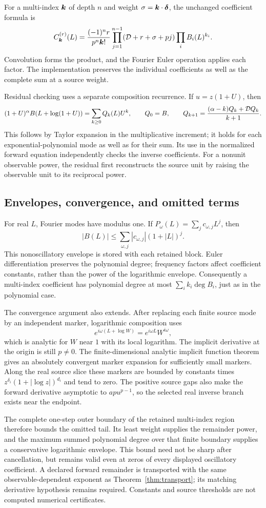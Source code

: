 For a multi-index $\boldsymbol k$ of depth $n$ and weight
$\sigma=\boldsymbol k\cdot\boldsymbol\delta$, the unchanged coefficient formula is
\[
 C^{(r)}_{\boldsymbol k}(L)=\frac{(-1)^n r}{p^n\boldsymbol k!}
 \prod_{j=1}^{n-1}(\mathcal D+r+\sigma+pj)\prod_i B_i(L)^{k_i}.
\]
Convolution forms the product, and the Fourier Euler operation applies each
factor. The implementation preserves the individual coefficients as well as
the complete sum at a source weight.

Residual checking uses a separate composition recurrence. If
$u=z(1+U)$, then
\[
 (1+U)^\alpha B(L+\log(1+U))=\sum_{k\ge0}Q_k(L)U^k,
 \qquad Q_0=B,\qquad
 Q_{k+1}=\frac{(\alpha-k)Q_k+\mathcal D Q_k}{k+1}.
\]
This follows by Taylor expansion in the multiplicative increment; it holds
for each exponential-polynomial mode as well as for their sum. Its use in
the normalized forward equation independently checks the inverse coefficients.
For a nonunit observable power, the residual first reconstructs the source
unit by raising the observable unit to its reciprocal power.

\subsection{Envelopes, convergence, and omitted terms}

For real $L$, Fourier modes have modulus one. If
$P_\omega(L)=\sum_j c_{\omega,j}L^j$, then
\[
 |B(L)|\le\sum_{\omega,j}|c_{\omega,j}|(1+|L|)^j.
\]
This nonoscillatory envelope is stored with each retained block. Euler
differentiation preserves the polynomial degree; frequency factors affect
coefficient constants, rather than the power of the logarithmic envelope.
Consequently a multi-index coefficient has polynomial degree at most
$\sum_i k_i\deg B_i$, just as in the polynomial case.

The convergence argument also extends. After replacing each finite source
mode by an independent marker, logarithmic composition uses
\[
 e^{i\omega(L+\log W)}=e^{i\omega L}W^{i\omega},
\]
which is analytic for $W$ near $1$ with its local logarithm. The implicit
derivative at the origin is still $p\ne0$. The finite-dimensional analytic
implicit function theorem gives an absolutely convergent marker expansion
for sufficiently small markers. Along the real source slice these markers
are bounded by constants times $z^{\delta_i}(1+|\log z|)^{d_i}$ and tend to
zero. The positive source gaps also make the forward derivative asymptotic
to $ap u^{p-1}$, so the selected real inverse branch exists near the endpoint.

The complete one-step outer boundary of the retained multi-index region
therefore bounds the omitted tail. Its least weight supplies the remainder
power, and the maximum summed polynomial degree over that finite boundary
supplies a conservative logarithmic envelope. This bound need not be sharp
after cancellation, but remains valid even at zeros of every displayed
oscillatory coefficient. A declared forward remainder is transported with
the same observable-dependent exponent as Theorem~\ref{thm:transport}; its
matching derivative hypothesis remains required. Constants and source
thresholds are not computed numerical certificates.

